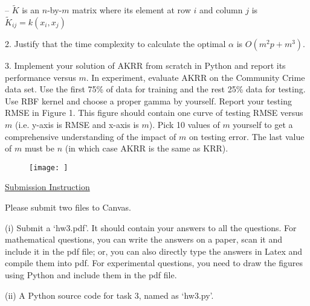 \documentclass{llncs}
\begin{document}
-- $\tilde{K}$ is an $n$-by-$m$ matrix where its 
element at row $i$ and column $j$ is 
$\tilde{K}_{ij} = k(x_i, x_j)$ 

\vspace{10pt}

2. Justify that the time complexity to 
calculate the optimal $\alpha$ is $O(m^2p+ m^3)$.

\vspace{10pt}

3. Implement your solution of AKRR from scratch in 
Python and report its performance versus $m$. 
In experiment, evaluate AKRR on the Community Crime 
data set. Use the first 75\% of data for training and 
the rest 25\% data for testing. Use RBF kernel 
and choose a proper gamma by yourself. 
Report your testing RMSE in Figure 1. This figure 
should contain one curve of testing RMSE versus $m$ 
(i.e. y-axis is RMSE and x-axis is $m$). Pick 10 values 
of $m$ yourself to get a comprehensive understanding of 
the impact of $m$ on testing error. The last value of 
$m$ must be $n$ (in which case AKRR is the same as KRR). 

\begin{figure}[h]
\centering
\texttt{[image: ]}
\caption{}
\label{fig}
\end{figure}

\newpage 

\underline{Submission Instruction}

Please submit two files to Canvas. 

(i) Submit a `hw3.pdf'. It should contain 
your answers to all the questions. 
For mathematical questions, you can 
write the answers on a paper, scan it and 
include it in the pdf file; or, you can 
also directly type the answers in Latex 
and compile them into pdf. For experimental 
questions, you need to draw the figures 
using Python and include them in the pdf file. 

(ii) A Python source code for task 3, 
named as `hw3.py'. 
\end{document}
